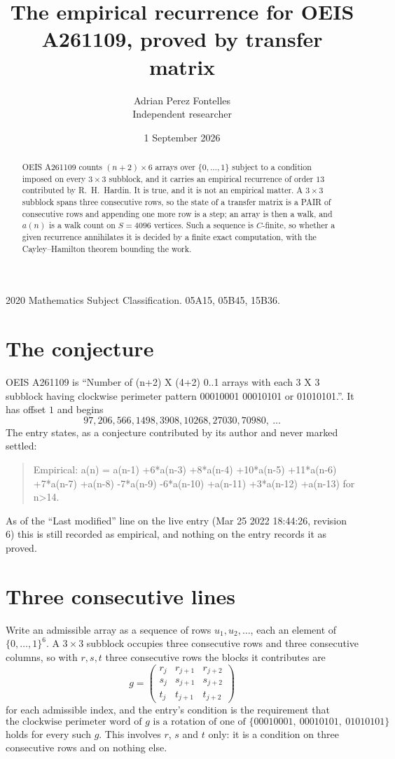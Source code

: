 \documentclass[11pt,a4paper]{article}
\title{The empirical recurrence for OEIS A261109, proved by transfer matrix}
\author{Adrian Perez Fontelles\\ \small Independent researcher}
\date{1 September 2026}
\theoremstyle{plain}
\theoremstyle{definition}
\begin{document}
\maketitle

\begin{abstract}
OEIS A261109 counts $(n+2)\times6$ arrays over $\{0,\dots,1\}$ subject to a condition imposed on
every $3\times3$ subblock, and it carries an empirical recurrence of order $13$
contributed by R.~H.~Hardin. It is true, and it is not an empirical matter. A $3\times3$
subblock spans three consecutive rows, so the state of a transfer matrix is a PAIR of
consecutive rows and appending one more row is a step; an array is then a walk, and
$a(n)$ is a walk count on $S=4096$ vertices. Such a sequence is $C$-finite, so whether a given
recurrence annihilates it is decided by a finite exact computation, with the Cayley--Hamilton
theorem bounding the work.
\end{abstract}

\noindent\small 2020 Mathematics Subject Classification. 05A15, 05B45, 15B36.\normalsize

\section{The conjecture}

OEIS A261109 is ``Number of (n+2) X (4+2) 0..1 arrays with each 3 X 3 subblock having clockwise perimeter pattern 00010001 00010101 or 01010101.''. It has offset $1$ and begins
\[
97, 206, 566, 1498, 3908, 10268, 27030, 70980,\ \dots
\]
The entry states, as a conjecture contributed by its author and never marked settled:
\begin{quote}
Empirical: a(n) = a(n-1) +6*a(n-3) +8*a(n-4) +10*a(n-5) +11*a(n-6) +7*a(n-7) +a(n-8) -7*a(n-9) -6*a(n-10) +a(n-11) +3*a(n-12) +a(n-13) for n>14.
\end{quote}
As of the ``Last modified'' line on the live entry (Mar 25 2022 18:44:26, revision 6) this is still
recorded as empirical, and nothing on the entry records it as proved.

\section{Three consecutive lines}

Write an admissible array as a sequence of rows $u_1,u_2,\dots$, each an element of
$\{0,\dots,1\}^{6}$. A $3\times3$ subblock occupies three consecutive rows and
three consecutive columns, so with $r,s,t$ three consecutive rows the blocks it
contributes are
\[
g=\begin{pmatrix}r_j&r_{j+1}&r_{j+2}\\ s_j&s_{j+1}&s_{j+2}\\ t_j&t_{j+1}&t_{j+2}\end{pmatrix}
\]
for each admissible index, and the entry's condition is the requirement that
\[
\text{the clockwise perimeter word of }g\text{ is a rotation of one of }\{00010001,\ 00010101,\ 01010101\}
\]
holds for every such $g$. This involves $r$, $s$ and $t$ only: it is a condition on
three consecutive rows and on nothing else.
\end{document}
